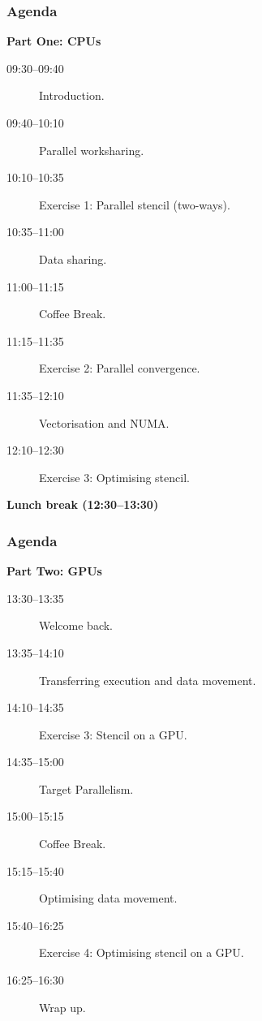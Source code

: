 \documentclass[aspectratio=169]{beamer}
\begin{document}


\begin{frame}
\frametitle{Agenda}

\textbf{Part One: CPUs}
\begin{description}
  \item[09:30--09:40] Introduction.
  \item[09:40--10:10] Parallel worksharing.
  \item[10:10--10:35] Exercise 1: Parallel stencil (two-ways).
  \item[10:35--11:00] Data sharing.
  \item[11:00--11:15] Coffee Break.
  \item[11:15--11:35] Exercise 2: Parallel convergence.
  \item[11:35--12:10] Vectorisation and NUMA.
  \item[12:10--12:30] Exercise 3: Optimising stencil.
\end{description}

\textbf{Lunch break (12:30--13:30)}
\end{frame}

\begin{frame}
\frametitle{Agenda}
\textbf{Part Two: GPUs}
\begin{description}
  \item[13:30--13:35] Welcome back.
  \item[13:35--14:10] Transferring execution and data movement.
  \item[14:10--14:35] Exercise 3: Stencil on a GPU.
  \item[14:35--15:00] Target Parallelism.
  \item[15:00--15:15] Coffee Break.
  \item[15:15--15:40] Optimising data movement.
  \item[15:40--16:25] Exercise 4: Optimising stencil on a GPU.
  \item[16:25--16:30] Wrap up.
\end{description}
\end{frame}


\end{document}
